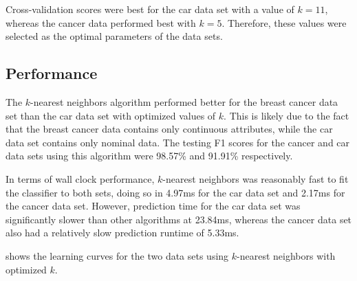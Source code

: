 \documentclass{article}
\begin{document}
    Cross-validation scores were best for the car data set with a value of $k=11$, whereas the cancer data performed best with $k=5$. Therefore, these values were selected as the optimal parameters of the data sets.

    \subsection{Performance}
    The $k$-nearest neighbors algorithm performed better for the breast cancer data set than the car data set with optimized values of $k$. This is likely due to the fact that the breast cancer data contains only continuous attributes, while the car data set contains only nominal data. The testing F1 scores for the cancer and car data sets using this algorithm were 98.57\% and 91.91\% respectively.

    In terms of wall clock performance, $k$-nearest neighbors was reasonably fast to fit the classifier to both sets, doing so in 4.97ms for the car data set and 2.17ms for the cancer data set. However, prediction time for the car data set was significantly slower than other algorithms at 23.84ms, whereas the cancer data set also had a relatively slow prediction runtime of 5.33ms.

     shows the learning curves for the two data sets using $k$-nearest neighbors with optimized $k$.
\end{document}
